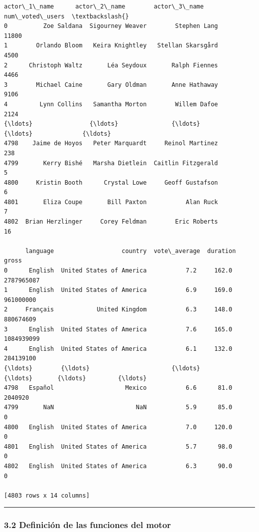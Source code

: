 \begin{tcolorbox}[breakable, boxrule=.5pt, size=fbox, pad at break*=1mm, opacityfill=0]
\begin{Verbatim}[commandchars=\\\{\}]
          actor\_1\_name      actor\_2\_name        actor\_3\_name  num\_voted\_users  \textbackslash{}
0          Zoe Saldana  Sigourney Weaver        Stephen Lang            11800
1        Orlando Bloom   Keira Knightley   Stellan Skarsgård             4500
2      Christoph Waltz       Léa Seydoux       Ralph Fiennes             4466
3        Michael Caine       Gary Oldman       Anne Hathaway             9106
4         Lynn Collins   Samantha Morton        Willem Dafoe             2124
{\ldots}                {\ldots}               {\ldots}                 {\ldots}              {\ldots}
4798    Jaime de Hoyos   Peter Marquardt     Reinol Martinez              238
4799       Kerry Bishé   Marsha Dietlein  Caitlin Fitzgerald                5
4800     Kristin Booth      Crystal Lowe     Geoff Gustafson                6
4801       Eliza Coupe       Bill Paxton           Alan Ruck                7
4802  Brian Herzlinger     Corey Feldman        Eric Roberts               16

      language                   country  vote\_average  duration       gross
0      English  United States of America           7.2     162.0  2787965087
1      English  United States of America           6.9     169.0   961000000
2     Français            United Kingdom           6.3     148.0   880674609
3      English  United States of America           7.6     165.0  1084939099
4      English  United States of America           6.1     132.0   284139100
{\ldots}        {\ldots}                       {\ldots}           {\ldots}       {\ldots}         {\ldots}
4798   Español                    Mexico           6.6      81.0     2040920
4799       NaN                       NaN           5.9      85.0           0
4800   English  United States of America           7.0     120.0           0
4801   English  United States of America           5.7      98.0           0
4802   English  United States of America           6.3      90.0           0

[4803 rows x 14 columns]
\end{Verbatim}
\end{tcolorbox}
        
    \begin{center}\rule{0.5\linewidth}{\linethickness}\end{center}

\subsubsection{3.2 Definición de las funciones del
motor}\label{definiciuxf3n-de-las-funciones-del-motor}

